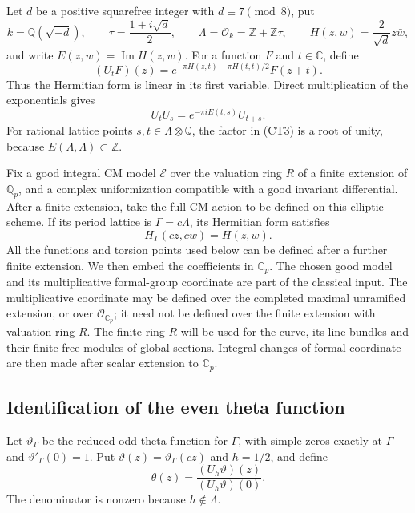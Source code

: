 Let $d$ be a positive squarefree integer with $d\equiv7\pmod8$,
put
\[
 k=\mathbb Q(\sqrt{-d}),\qquad
 \tau=\frac{1+i\sqrt d}{2},\qquad
 \Lambda=\mathcal O_k=\mathbb Z+\mathbb Z\tau,
 \qquad H(z,w)=\frac{2}{\sqrt d}z\bar w,
 \tag{CT1}
\]
and write $E(z,w)=\operatorname{Im}H(z,w)$.
For a function $F$ and $t\in\mathbb C$, define
\[
 (U_tF)(z)=
  e^{-\pi H(z,t)-\pi H(t,t)/2}F(z+t).
 \tag{CT2}
\]
Thus the Hermitian form is linear in its first variable.
Direct multiplication of the exponentials gives
\[
                   U_tU_s=e^{-\pi iE(t,s)}U_{t+s}.
 \tag{CT3}
\]
For rational lattice points $s,t\in\Lambda\otimes\mathbb Q$,
the factor in (CT3) is a root of unity, because
$E(\Lambda,\Lambda)\subset\mathbb Z$.

Fix a good integral CM model $\mathscr E$ over the valuation ring
$R$ of a finite extension of $\mathbb Q_p$, and a complex
uniformization compatible with a good invariant differential.
After a finite extension, take the full CM action to be defined
on this elliptic scheme.
If its period lattice is $\Gamma=c\Lambda$, its Hermitian form
satisfies
\[
                        H_\Gamma(cz,cw)=H(z,w).
 \tag{CT4}
\]
All the functions and torsion points used below can be defined
after a further finite extension.  We then embed the coefficients
in $\mathbb C_p$.  The chosen good model and its multiplicative
formal-group coordinate are part of the classical input.
The multiplicative coordinate may be defined over the completed
maximal unramified extension, or over $\mathcal O_{\mathbb C_p}$;
it need not be defined over the finite extension with valuation
ring $R$.  The finite ring $R$ will be used for the curve, its
line bundles and their finite free modules of global sections.
Integral changes of formal coordinate are then made after scalar
extension to $\mathbb C_p$.

\subsection{Identification of the even theta function}

Let $\vartheta_\Gamma$ be the reduced odd theta function for
$\Gamma$, with simple zeros exactly at $\Gamma$ and
$\vartheta'_\Gamma(0)=1$.  Put
$\vartheta(z)=\vartheta_\Gamma(cz)$ and $h=1/2$, and define
\[
                 \theta(z)=\frac{(U_h\vartheta)(z)}
                                      {(U_h\vartheta)(0)}.
 \tag{CT5}
\]
The denominator is nonzero because $h\notin\Lambda$.

